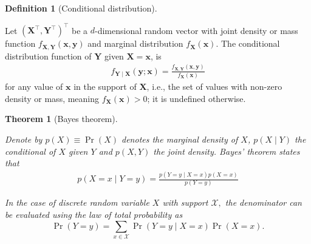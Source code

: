 \documentclass[
  11pt,
  letterpaper,
]{scrbook}
\theoremstyle{definition}
\theoremstyle{plain}
\theoremstyle{plain}
\newtheorem{theorem}{Theorem}[chapter]
\theoremstyle{definition}
\theoremstyle{definition}
\newtheorem{definition}{Definition}[chapter]
\theoremstyle{remark}
\begin{document}
\begin{definition}[Conditional
distribution]\protect\hypertarget{def-conditional-dist}{}\label{def-conditional-dist}

Let \((\boldsymbol{X}^\top, \boldsymbol{Y}^\top)^\top\) be a
\(d\)-dimensional random vector with joint density or mass function
\(f_{\boldsymbol{X}, \boldsymbol{Y}}(\boldsymbol{x}, \boldsymbol{y})\)
and marginal distribution \(f_{\boldsymbol{X}}(\boldsymbol{x})\). The
conditional distribution function of \(\boldsymbol{Y}\) given
\(\boldsymbol{X}=\boldsymbol{x}\), is \begin{align*}
f_{\boldsymbol{Y} \mid \boldsymbol{X}}(\boldsymbol{y}; \boldsymbol{x}) = \frac{f_{\boldsymbol{X}, \boldsymbol{Y}}(\boldsymbol{x}, \boldsymbol{y})}{f_{\boldsymbol{X}}(\boldsymbol{x})}
\end{align*} for any value of \(\boldsymbol{x}\) in the support of
\(\boldsymbol{X}\), i.e., the set of values with non-zero density or
mass, meaning \(f_{\boldsymbol{X}}(\boldsymbol{x})>0\); it is undefined
otherwise.

\end{definition}

\begin{theorem}[Bayes
theorem]\protect\hypertarget{thm-Bayes}{}\label{thm-Bayes}

Denote by \(p(X) \equiv\Pr(X)\) denotes the marginal density of \(X\),
\(p(X \mid Y)\) the conditional of \(X\) given \(Y\) and \(p(X, Y)\) the
joint density. Bayes' theorem states that \begin{align*}
p(X = x \mid Y=y) = \frac{p(Y = y \mid X = x)p(X=x)}{p(Y=y)}
\end{align*}

In the case of discrete random variable \(X\) with support
\(\mathcal{X},\) the denominator can be evaluated using the law of total
probability as
\[\Pr(Y=y) = \sum_{x \in \mathcal{X}}\Pr(Y =y \mid X=x)\Pr(X=x).\]

\end{theorem}
\end{document}
